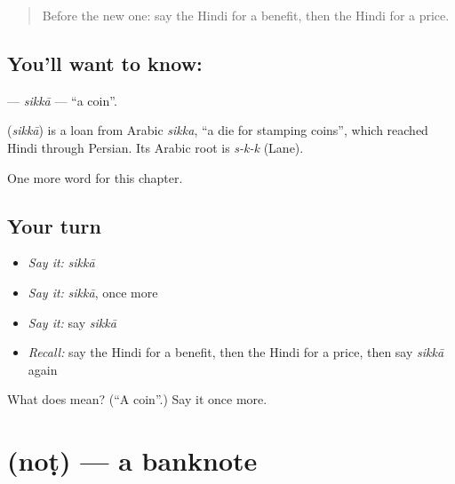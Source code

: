 \label{lesson:HI-C208-sikka}



\begin{quote}
Before the new one: say the Hindi for a benefit, then the Hindi for a price.
\end{quote}

\subsection*{You'll want to know: }
\textbf{} — \emph{sikkā} — \textquotedblleft{}a coin\textquotedblright{}.

\begin{cousinweb}
\textbf{} (\emph{sikkā}) is a loan from Arabic \emph{sikka}, \textquotedblleft{}a die for stamping coins\textquotedblright{}, which reached Hindi through Persian. Its Arabic root is \emph{s-k-k} (Lane).
\end{cousinweb}

\begin{grammarlens}[title={What you've built}]
One more word for this chapter.
\end{grammarlens}

\subsection*{Your turn}
\begin{itemize}
\raggedright
  \item \emph{Say it:} \emph{sikkā}
  \item \emph{Say it:} \emph{sikkā}, once more
  \item \emph{Say it:} say \emph{sikkā}
  \item \emph{Recall:} say the Hindi for a benefit, then the Hindi for a price, then say \emph{sikkā} again
\end{itemize}

\begin{tcolorbox}[breakable,colback=teal!4,colframe=teal!35!black,title={Before you move on}]
What does  mean? (\textquotedblleft{}A coin\textquotedblright{}.) Say it once more.
\end{tcolorbox}
\section[\texorpdfstring{\hi{नोट} (noṭ)}{नोट (noṭ)}]{ (noṭ) — a banknote}

\label{lesson:HI-C208-not}



